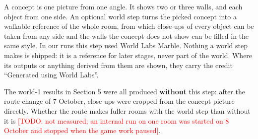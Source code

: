 A concept is one picture from one angle. It shows two or three walls, and each object from one side. An optional world step turns the picked concept into a walkable reference of the whole room, from which close-ups of every object can be taken from any side and the walls the concept does not show can be filled in the same style. In our runs this step used World Labs Marble. Nothing a world step makes is shipped: it is a reference for later stages, never part of the world. Where its outputs or anything derived from them are shown, they carry the credit ``Generated using World Labs''.

The world-1 results in Section 5 were all produced \textbf{without} this step: after the route change of 7 October, close-ups were cropped from the concept picture directly. Whether the route makes fuller rooms with the world step than without it is \textcolor{red}{[TODO: not measured; an internal run on one room was started on 8 October and stopped when the game work paused]}.
